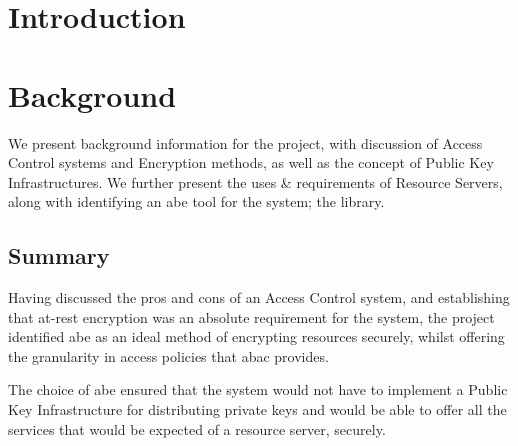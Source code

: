 \documentclass[british,table,svgnames,xcdraw]{l4proj}
\begin{document}
\chapter{Introduction}
\label{ch:introduction}











\chapter{Background}
\label{ch:background}

We present background information for the project, with discussion of Access Control systems and Encryption methods, as well as the concept of Public Key Infrastructures. We further present the uses \& requirements of Resource Servers, along with identifying an \acrshort{abe} tool for the system; the \OpenABE library.











\section{Summary}
\label{sec:bkgr_summary}

Having discussed the pros and cons of an Access Control system, and establishing that at-rest encryption was an absolute requirement for the \theResServer system, the project identified \acrfull{abe} as an ideal method of encrypting resources securely, whilst offering the granularity in access policies that \acrfull{abac} provides.

The choice of \acrshort{abe} ensured that the system would not have to implement a Public Key Infrastructure for distributing private keys and would be able to offer all the services that would be expected of a resource server, securely.
\end{document}
